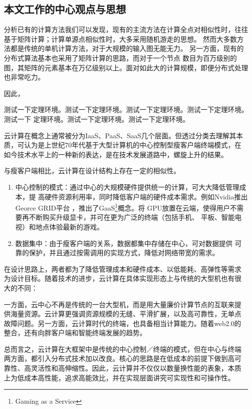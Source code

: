 \documentclass[master]{njuthesis}
\begin{document}
\subsection{本文工作的中心观点与思想}
分析已有的计算方法我们可以发现，现有的主流方法在计算全点对相似性时，往往基于矩阵计算；计算单源点相似性时，大多采用随机游走的思想。
然而大多数方法都是传统的单机计算方法，对于大规模的输入图无能无力。 另一方面，现有的分布式算法基本也采用了矩阵计算的思路，而对于一个节点
数目为百万级别的图，其矩阵的元素基本在万亿级别以上。面对如此大的计算规模，即便分布式处理也非常吃力。

因此，


\begin{algorithm}
测试一下定理环境。测试一下定理环境。测试一下定理环境。测试一下定理环境。测试一下
定理环境。测试一下定理环境。测试一下定理环境。
\end{algorithm}


云计算在概念上通常被分为IaaS、PaaS、SaaS几个层面。但透过分类去理解其本
质，可认为是上世纪70年代基于大型计算机的中心控制型瘦客户端终端模式，在
如今技术水平上的一种新的表达，是在技术发展道路中，螺旋上升的结果。

与瘦客户端相比，云计算在设计结构上存在一定的相似性。

\begin{enumerate}
\item 中心控制的模式：通过中心的大规模硬件提供统一的计算，可大大降低管理成本，提
  高硬件资源利用率，同时降低客户端的硬件成本需求。例如Nvidia推出Georce GRID平台
  \cite{NVIDIAGRID}，推出了GaaS\footnote{Gaming as a Service}概念。将
  GPU放置在云端，使得用户不需要再不断购买升级显卡，并可在更为广泛的终端（包括手机、
  平板、智能电视）和地点体验最新的游戏。
\item 数据集中：由于瘦客户端的关系，数据都集中存储在中心，可对数据提供
  可靠的保护，并且通过按需调用的实现方式，降低对网络带宽的需求。
\end{enumerate}

在设计思路上，两者都为了降低管理成本和硬件成本、以低能耗、高弹性等需求
为设计目标。随着技术的进步，云计算在具体实现形态上与传统的大型机也有很
大的不同：

一方面，云中心不再是传统的一台大型机，而是用大量廉价计算节点的互联来提
供海量资源。云计算更强调资源规模的无缝、平滑扩展，以及高可靠性，无单点
故障问题。另一方面，云计算时代的终端，也具备相当计算能力。随着web2.0的
整合，还有向胖客户端和智能终端发展的趋势。

总而言之，云计算在大框架中是传统的中心控制／终端的模式，但在中心与终端
两方面，都引入分布式技术加以改良。核心的思路是在低成本的前提下做到高可
靠性、高灵活性和高伸缩性。因此，云计算并不仅仅以数量换性能的表象，本质
上为低成本高性能，追求高能效比，并在实现层面讲究可实现性和可操作性。
\end{document}
